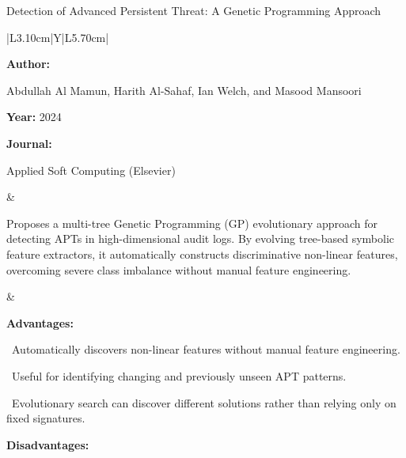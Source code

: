 \begin{frame}[t]{Detection of Advanced Persistent Threat: A Genetic Programming Approach}
\vspace{-0.30em}
{\footnotesize\setlength{\tabcolsep}{3.5pt}\renewcommand{\arraystretch}{1.10}
\begin{tabularx}{\textwidth}{|L{3.10cm}|Y|L{5.70cm}|}
\hline\lrhdr\hline
\begin{minipage}[t]{\linewidth}\fontsize{7.2pt}{9.2pt}\raggedright\selectfont
\textbf{Author:}\par
Abdullah Al Mamun, Harith Al-Sahaf, Ian Welch, and Masood Mansoori\par\vspace{4pt}
\textbf{Year:} 2024\par\vspace{4pt}
\textbf{Journal:}\par
Applied Soft Computing (Elsevier)\par\vspace{4pt}
\end{minipage}
&
\begin{minipage}[t]{\linewidth}\fontsize{7.2pt}{9.2pt}\raggedright\selectfont
Proposes a multi-tree Genetic Programming (GP) evolutionary approach for detecting APTs in high-dimensional audit logs. By evolving tree-based symbolic feature extractors, it automatically constructs discriminative non-linear features, overcoming severe class imbalance without manual feature engineering.\par\vspace{4pt}
\end{minipage}
&
\begin{minipage}[t]{\linewidth}\fontsize{6.7pt}{8.2pt}\raggedright\selectfont
\textcolor{strengthGreen}{\textbf{Advantages:}}\par\vspace{1.3pt}
\textbullet~Automatically discovers non-linear features without manual feature engineering.\par\vspace{1.8pt}\textbullet~Useful for identifying changing and previously unseen APT patterns.\par\vspace{1.8pt}\textbullet~Evolutionary search can discover different solutions rather than relying only on fixed signatures.\par\vspace{3.2pt}
\textcolor{limitRed}{\textbf{Disadvantages:}}\par\vspace{1.3pt}

\end{minipage}
\end{tabularx}}
\end{frame}
